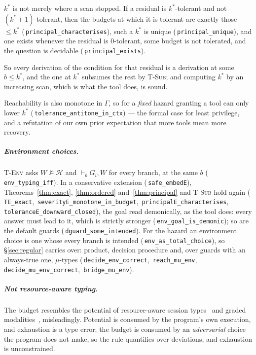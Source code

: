 \documentclass[a4paper,UKenglish,cleveref,autoref,thm-restate,anonymous]{lipics-v2021}
\newcommand{\Haz}{\mathcal H}
\newcommand{\safeT}[1]{\vdash_{#1}}
\newcommand{\coqok}[1]{\textcolor{okgreen}{\ding{51}}\,\texttt{\small #1}}
\newcommand{\kstar}{k^{*}}
\begin{document}
\begin{theorem}[$\kstar$ is principal]\label{thm:principal}
$\kstar$ is not merely where a scan stopped. If a residual is
$\kstar$-tolerant and not $(\kstar{+}1)$-tolerant, then the budgets at which
it is tolerant are exactly those $\le\kstar$ (\coqok{principal\_characterises}),
such a $\kstar$ is unique (\coqok{principal\_unique}), and one exists whenever
the residual is $0$-tolerant, some budget is not tolerated, and the question is
decidable (\coqok{principal\_exists}).
\end{theorem}

So every derivation of the condition for that residual is a derivation at some
$b\le\kstar$, and the one at $\kstar$ subsumes the rest by \textsc{T-Sub}; and
computing $\kstar$ by an increasing scan, which is what the tool does, is
sound.

Reachability is also monotone in $\Gamma$, so for a \emph{fixed} hazard
granting a tool can only lower $\kstar$
(\coqok{tolerance\_antitone\_in\_ctx}) --- the formal case for least
privilege, and a refutation of our own prior expectation that more tools mean
more recovery.

\subparagraph*{Environment choices.} \textsc{T-Env} asks $W\nvDash\Haz$ and
$\safeT{b}G_i,W$ for every branch, at the same $b$ (\coqok{env\_typing\_iff}).
In a conservative extension (\coqok{safe\_embedE}), Theorems~\ref{thm:exact},
\ref{thm:ordered} and~\ref{thm:principal} and \textsc{T-Sub} hold again
(\coqok{TE\_exact}, \coqok{severityE\_monotone\_in\_budget},
\coqok{principalE\_characterises}, \coqok{toleranceE\_downward\_closed}), the
goal read demonically, as the tool does: every answer must lead to it, which is
strictly stronger (\coqok{env\_goal\_is\_demonic}); so are the default guards
(\coqok{dguard\_some\_intended}). For the hazard an environment choice is one
whose every branch is intended (\coqok{env\_as\_total\_choice}), so
\S\ref{sec:regular} carries over: product, decision procedure and, over guards
with an always-true one, $\mu$-types (\coqok{decide\_env\_correct},
\coqok{reach\_mu\_env}, \coqok{decide\_mu\_env\_correct}, \coqok{bridge\_mu\_env}).

\subparagraph*{Not resource-aware typing.} The budget resembles the potential
of resource-aware session types~\cite{das-lics18,das-popl23} and graded
modalities~\cite{orchard-icfp19}, misleadingly. Potential is consumed by the
program's own execution, and exhaustion is a type error; the budget is consumed
by an \emph{adversarial} choice the program does not make, so the rule
quantifies over deviations, and exhaustion is unconstrained.
\end{document}
